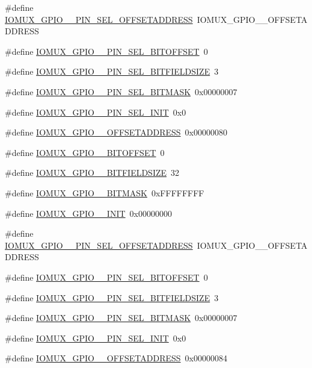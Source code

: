 \begin{DoxyCompactItemize}
\item 
\#define \hyperlink{a00560_a3a9b979a9fec6b6df4e54d3311192eaf}{IOMUX\_\-GPIO\_\_\-PIN\_\-SEL\_\-OFFSETADDRESS}~IOMUX\_\-GPIO\_\_\-OFFSETADDRESS
\item 
\#define \hyperlink{a00560_a554df326e2937bb36c971ec013d87212}{IOMUX\_\-GPIO\_\_\-PIN\_\-SEL\_\-BITOFFSET}~0
\item 
\#define \hyperlink{a00560_aedd34bb870d0ed249499d0a6716894e1}{IOMUX\_\-GPIO\_\_\-PIN\_\-SEL\_\-BITFIELDSIZE}~3
\item 
\#define \hyperlink{a00560_ae36f1afafca45cfaa703bac65f559aad}{IOMUX\_\-GPIO\_\_\-PIN\_\-SEL\_\-BITMASK}~0x00000007
\item 
\#define \hyperlink{a00560_aab0214a978f281f242cd8434e71ab5c5}{IOMUX\_\-GPIO\_\_\-PIN\_\-SEL\_\-INIT}~0x0
\item 
\#define \hyperlink{a00560_a54f59aa31845cf1f5ac6e71e446e87b2}{IOMUX\_\-GPIO\_\_\-OFFSETADDRESS}~0x00000080
\item 
\#define \hyperlink{a00560_a299c10637e992cd1d8a06173727bf663}{IOMUX\_\-GPIO\_\_\-BITOFFSET}~0
\item 
\#define \hyperlink{a00560_a8ff07c1c65a7056bd117885bb178bfcf}{IOMUX\_\-GPIO\_\_\-BITFIELDSIZE}~32
\item 
\#define \hyperlink{a00560_aba3f6ebc42be7984eef617734278b9ab}{IOMUX\_\-GPIO\_\_\-BITMASK}~0xFFFFFFFF
\item 
\#define \hyperlink{a00560_a5fb8a87f53b7023a2ed91032eba19f41}{IOMUX\_\-GPIO\_\_\-INIT}~0x00000000
\item 
\#define \hyperlink{a00560_a791f7af172f7a0f4b069becfb1b6ef69}{IOMUX\_\-GPIO\_\_\-PIN\_\-SEL\_\-OFFSETADDRESS}~IOMUX\_\-GPIO\_\_\-OFFSETADDRESS
\item 
\#define \hyperlink{a00560_abac67e91714571d983eaf1489dc4fd98}{IOMUX\_\-GPIO\_\_\-PIN\_\-SEL\_\-BITOFFSET}~0
\item 
\#define \hyperlink{a00560_acd08dc683b8900e8fa5decb747312504}{IOMUX\_\-GPIO\_\_\-PIN\_\-SEL\_\-BITFIELDSIZE}~3
\item 
\#define \hyperlink{a00560_ab9b41b6b580cf9af355b9dd4f4e2d7e3}{IOMUX\_\-GPIO\_\_\-PIN\_\-SEL\_\-BITMASK}~0x00000007
\item 
\#define \hyperlink{a00560_a82d8e051a9fe4c51f49c66836b2f58c5}{IOMUX\_\-GPIO\_\_\-PIN\_\-SEL\_\-INIT}~0x0
\item 
\#define \hyperlink{a00560_a9afa795defb72e668d72788c431a8602}{IOMUX\_\-GPIO\_\_\-OFFSETADDRESS}~0x00000084
\item 

\end{DoxyCompactItemize}
